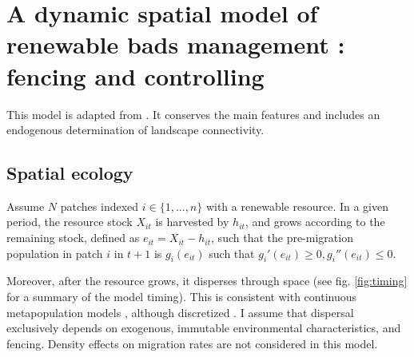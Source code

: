 
\section{A dynamic spatial model of renewable bads management : fencing and controlling}
\label{sec:model}

This model is adapted from \cite{costello_private_2017}. It conserves the main features and includes an endogenous determination of landscape connectivity.

\subsection{Spatial ecology}
Assume $N$ patches indexed $i\in \{1, ..., n\}$ with a renewable resource. In a given period, the resource stock $X_{it}$ is harvested by $h_{it}$, and grows according to the remaining stock, defined as $e_{it} = X_{it} - h_{it}$, such that the pre-migration population in patch $i$ in $t+1$ is $g_i(e_{it})$ such that $g_i'(e_{it})\geq0, g_i''(e_{it}) \leq 0$.

Moreover, after the resource grows, it disperses through space (see fig. \ref{fig:timing} for a summary of the model timing). This is consistent with continuous metapopulation models \citep{sanchirico_bioeconomics_1999, bulte_metapopulation_1999}, although discretized \citep{costello_private_2017}. I assume that dispersal exclusively depends on exogenous, immutable environmental characteristics, and fencing. Density effects on migration rates are not considered in this model.

